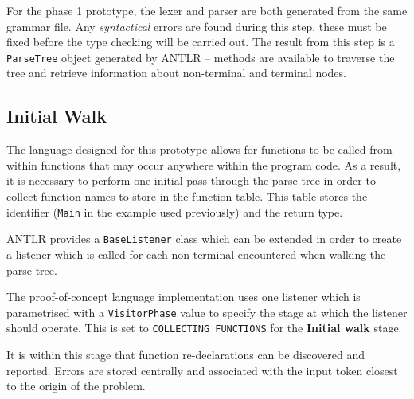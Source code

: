 \documentclass[a4paper]{article}
\begin{document}
    For the phase 1 prototype, the lexer and parser are both generated from the same grammar file. Any \emph{syntactical} errors are found during this step, these must be fixed before the type checking will be carried out. The result from this step is a \texttt{ParseTree} object  generated by ANTLR -- methods are available to traverse the tree and retrieve information about non-terminal and terminal nodes.
    
    \subsection*{Initial Walk}
    
    \hfill{}

    The language designed for this prototype allows for functions to be called from within functions that may occur anywhere within the program code. As a result, it is necessary to perform one initial pass through the parse tree in order to collect function names to store in the function table. This table stores the identifier (\texttt{Main} in the example used previously) and the return type.
    
    ANTLR provides a \texttt{BaseListener} class which can be extended in order to create a listener which is called for each non-terminal encountered when walking the parse tree.
    
    The proof-of-concept language implementation uses one listener which is parametrised with a \texttt{VisitorPhase} value to specify the stage at which the listener should operate. This is set to \texttt{COLLECTING\_FUNCTIONS} for the \textbf{Initial walk} stage.
    
    It is within this stage that function re-declarations can be discovered and reported. Errors are stored centrally and associated with the input token closest to the origin of the problem.
    
\end{document}
